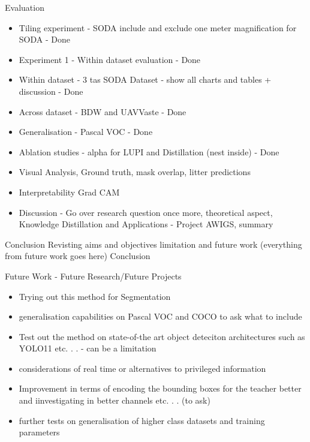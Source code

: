 Evaluation
\begin{itemize}
    \item Tiling experiment - SODA include and exclude one meter magnification for SODA - Done

    \item Experiment 1 - Within dataset evaluation - Done
    \item Within dataset - 3 tas SODA Dataset - show all charts and tables + discussion - Done
    \item Across dataset - BDW and UAVVaste - Done
    \item Generalisation - Pascal VOC - Done
    \item Ablation studies - alpha for LUPI and Distillation (nest inside) - Done
    \item Visual Analysis, Ground truth, mask overlap, litter predictions
    \item Interpretability Grad CAM
    \item Discussion - Go over research question once more, theoretical aspect, Knowledge Distillation and Applications - Project AWIGS, summary
\end{itemize}

Conclusion
Revisting aims and objectives
limitation and future work (everything from future work goes here)
Conclusion

Future Work - Future Research/Future Projects
\begin{itemize}
    \item Trying out this method for Segmentation
    \item generalisation capabilities on Pascal VOC and COCO to ask what to include
    \item Test out the method on state-of-the art object deteciton architectures such as YOLO11 etc. . . - can be a limitation
    \item considerations of real time or alternatives to privileged information
    \item Improvement in terms of encoding the bounding boxes for the teacher better and iinvestigating in better channels etc. . . (to ask)
    \item further tests on generalisation of higher class datasets and training parameters
\end{itemize}

